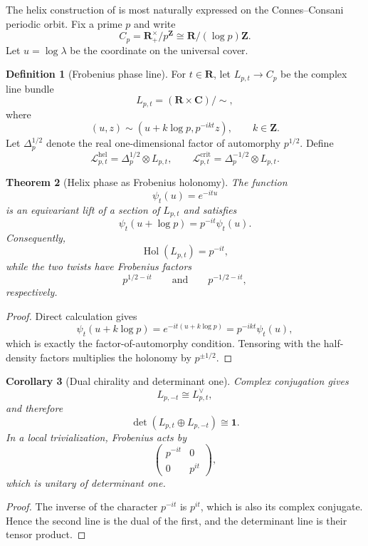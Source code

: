 \documentclass[11pt]{amsart}
\numberwithin{equation}{section}
\newtheorem{theorem}{Theorem}[section]
\newtheorem{corollary}[theorem]{Corollary}
\theoremstyle{definition}
\newtheorem{definition}[theorem]{Definition}
\newcommand{\Z}{\mathbf Z}
\newcommand{\R}{\mathbf R}
\newcommand{\C}{\mathbf C}
\newcommand{\cL}{\mathcal L}
\begin{document}
The helix construction of \cite{Lavery} is most naturally expressed on the
Connes--Consani periodic orbit.  Fix a prime $p$ and write
\[
C_p=\R_+^\times/p^\Z
\cong\R/(\log p)\Z.
\]
Let $u=\log\lambda$ be the coordinate on the universal cover.

\begin{definition}[Frobenius phase line]
\label{def:frobenius-phase-line}
For $t\in\R$, let $L_{p,t}\to C_p$ be the complex line bundle
\[
L_{p,t}=(\R\times\C)/\sim,
\]
where
\[
(u,z)\sim(u+k\log p,p^{-ikt}z),
\qquad k\in\Z.
\]
Let $\Delta_p^{1/2}$ denote the real one-dimensional factor of automorphy
$p^{1/2}$.  Define
\[
\cL^{\mathrm{hel}}_{p,t}=\Delta_p^{1/2}\otimes L_{p,t},
\qquad
\cL^{\mathrm{crit}}_{p,t}=\Delta_p^{-1/2}\otimes L_{p,t}.
\]
\end{definition}

\begin{theorem}[Helix phase as Frobenius holonomy]
\label{thm:helix-holonomy}
The function
\[
\psi_t(u)=e^{-itu}
\]
is an equivariant lift of a section of $L_{p,t}$ and satisfies
\[
\psi_t(u+\log p)=p^{-it}\psi_t(u).
\]
Consequently,
\[
\operatorname{Hol}(L_{p,t})=p^{-it},
\]
while the two twists have Frobenius factors
\[
p^{1/2-it}
\qquad\text{and}\qquad
p^{-1/2-it},
\]
respectively.
\end{theorem}

\begin{proof}
Direct calculation gives
\[
\psi_t(u+k\log p)
=e^{-it(u+k\log p)}
=p^{-ikt}\psi_t(u),
\]
which is exactly the factor-of-automorphy condition.  Tensoring with the
half-density factors multiplies the holonomy by $p^{\pm1/2}$.
\end{proof}

\begin{corollary}[Dual chirality and determinant one]
\label{cor:dual-chirality}
Complex conjugation gives
\[
L_{p,-t}\cong L_{p,t}^{\vee},
\]
and therefore
\[
\det(L_{p,t}\oplus L_{p,-t})\cong\mathbf1.
\]
In a local trivialization, Frobenius acts by
\[
\begin{pmatrix}
p^{-it}&0\\0&p^{it}
\end{pmatrix},
\]
which is unitary of determinant one.
\end{corollary}

\begin{proof}
The inverse of the character $p^{-it}$ is $p^{it}$, which is also its
complex conjugate.  Hence the second line is the dual of the first, and
the determinant line is their tensor product.
\end{proof}
\end{document}
